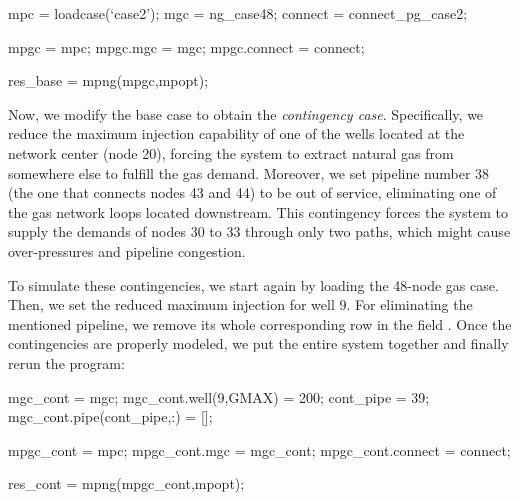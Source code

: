 \begin{Code}
mpc = loadcase(`case2');        %
mgc = ng_case48;                %
connect = connect_pg_case2;     %

mpgc = mpc;                     %
mpgc.mgc = mgc;                 %
mpgc.connect = connect;         %

res_base = mpng(mpgc,mpopt);         %
\end{Code}

Now, we modify the base case to obtain the \textit{contingency case}. Specifically, we reduce the maximum injection capability of one of the wells located at the network center (node 20), forcing the system to extract natural gas from somewhere else to fulfill the gas demand. Moreover, we set pipeline number 38 (the one that connects nodes 43 and 44) to be out of service, eliminating one of the gas network loops located downstream. This contingency forces the system to supply the demands of nodes 30 to 33 through only two paths, which might cause over-pressures and pipeline congestion. 

To simulate these contingencies, we start again by loading the 48-node gas case. Then, we set the reduced maximum injection for well 9. For eliminating the mentioned pipeline, we remove its whole corresponding row in the field . Once the contingencies are properly modeled, we put the entire system together and finally rerun the program:

\begin{Code}
mgc_cont = mgc;
mgc_cont.well(9,GMAX) = 200;        %
cont_pipe = 39; 		    %
mgc_cont.pipe(cont_pipe,:) = [];    %

mpgc_cont = mpc;                    %
mpgc_cont.mgc = mgc_cont;           %
mpgc_cont.connect = connect;	%

res_cont = mpng(mpgc_cont,mpopt);   %
\end{Code}

